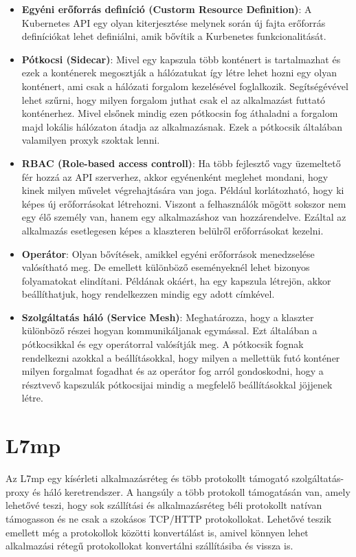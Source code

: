 \begin{itemize}
	\item \textbf{Egyéni erőforrás definíció (Custorm Resource Definition)}: A 
	Kubernetes API egy olyan kiterjesztése melynek során új fajta erőforrás definíciókat
	lehet definiálni, amik bővítik a Kurbenetes funkcionalitását.
	\item \textbf{Pótkocsi (Sidecar)}: Mivel egy kapszula több konténert is tartalmazhat
	és ezek a konténerek megosztják a hálózatukat így létre lehet hozni egy olyan 
	konténert, ami csak a hálózati forgalom kezelésével foglalkozik. Segítségévével lehet 
	szűrni, hogy milyen forgalom juthat csak el az alkalmazást futtató konténerhez. Mivel 
	elsőnek  mindig ezen pótkocsin fog áthaladni a forgalom majd lokális hálózaton átadja 
	az alkalmazásnak. Ezek a pótkocsik általában valamilyen proxyk szoktak lenni. 
	\item \textbf{RBAC (Role-based access controll)}: Ha több fejlesztő vagy üzemeltető
	fér hozzá az API szerverhez, akkor egyénenként meglehet mondani, hogy kinek milyen 
	művelet végrehajtására van joga. Például korlátozható, hogy ki képes új
	erőforrásokat létrehozni. Viszont a felhasználók mögött sokszor nem egy élő 
	személy van, hanem egy alkalmazáshoz van hozzárendelve. Ezáltal az alkalmazás 
	esetlegesen képes a klaszteren belülről erőforrásokat kezelni.
	\item \textbf{Operátor}: Olyan bővítések, amikkel egyéni erőforrások menedzselése
	valósítható meg. De emellett különböző eseményeknél lehet bizonyos folyamatokat 
	elindítani. Példának okáért, ha egy kapszula létrejön, akkor beállíthatjuk, hogy
	rendelkezzen mindig egy adott címkével.
	\item \textbf{Szolgáltatás háló (Service Mesh)}: Meghatározza, hogy a klaszter 
	különböző részei hogyan kommunikáljanak egymással. Ezt általában a pótkocsikkal és 
	egy operátorral valósítják meg. A pótkocsik fognak rendelkezni azokkal a 
	beállításokkal, hogy milyen a mellettük futó konténer milyen forgalmat fogadhat és az 
	operátor fog arról gondoskodni, hogy a résztvevő kapszulák pótkocsijai mindig a 
	megfelelő beállításokkal jöjjenek létre.
\end{itemize}

\section{L7mp}

Az L7mp egy kísérleti alkalmazásréteg és több protokollt támogató szolgáltatás- proxy és 
háló keretrendszer. A hangsúly a több protokoll támogatásán van, amely lehetővé teszi, 
hogy sok szállítási és alkalmazásréteg béli protokollt natívan támogasson és ne csak a 
szokásos TCP/HTTP protokollokat. Lehetővé teszik emellett még a protokollok közötti 
konvertálást is, amivel könnyen lehet alkalmazási rétegű protokollokat konvertálni 
szállításiba és vissza is.

